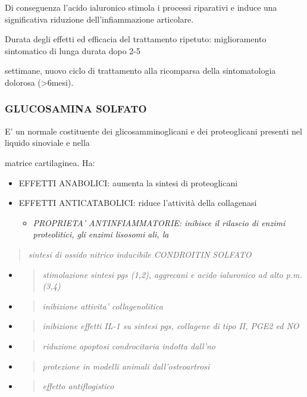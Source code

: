 \documentclass[]{article}
\begin{document}
Di conseguenza l'acido ialuronico stimola i processi riparativi e induce
una significativa riduzione dell'infiammazione articolare.

Durata degli effetti ed efficacia del trattamento ripetuto:
miglioramento sintomatico di lunga durata dopo 2-5

settimane, nuovo ciclo di trattamento alla ricomparsa della
sintomatologia dolorosa (\textgreater{}6mesi).

\subsubsection{GLUCOSAMINA SOLFATO}\label{glucosamina-solfato}

E' un normale costituente dei glicosamminoglicani e dei proteoglicani
presenti nel liquido sinoviale e nella

matrice cartilaginea. Ha:

\begin{itemize}
\item
  EFFETTI ANABOLICI: aumenta la sintesi di proteoglicani
\item
  EFFETTI ANTICATABOLICI: riduce l'attività della collagenasi

  \begin{itemize}
  \item
    \emph{PROPRIETA' ANTINFIAMMATORIE: inibisce il rilascio di enzimi
    proteolitici, gli enzimi lisosomi ali, la}
  \end{itemize}
\end{itemize}

\begin{quote}
\emph{sintesi di ossido nitrico inducibile CONDROITIN SOLFATO}
\end{quote}

\begin{itemize}
\item
  \begin{quote}
  \emph{stimolazione sintesi pgs (1,2), aggrecani e acido ialuronico ad
  alto p.m. (3,4)}
  \end{quote}
\item
  \begin{quote}
  \emph{inibizione attivita' collagenolitica}
  \end{quote}
\item
  \begin{quote}
  \emph{inibizione effetti IL-1 su sintesi pgs, collagene di tipo II,
  PGE2 ed NO}
  \end{quote}
\item
  \begin{quote}
  \emph{riduzione apoptosi condrocitaria indotta dall'no}
  \end{quote}
\item
  \begin{quote}
  \emph{protezione in modelli animali dall'osteoartrosi}
  \end{quote}
\item
  \begin{quote}
  \emph{effetto antiflogistico}
  \end{quote}
\end{itemize}
\end{document}
